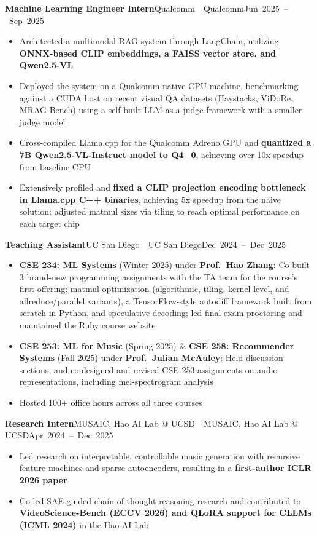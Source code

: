 \documentclass[letterpaper,11pt]{article}
\newcommand{\entry}[3]{%
  \needspace{4\baselineskip}%
  \textbf{#1}\ifx\relax#2\relax\else\ \textbar\ #2\fi\hfill\mbox{#3}\par}
\newenvironment{bullets}
  {\begin{itemize}[leftmargin=1.2em, label=\textbullet, itemsep=0.5pt, parsep=0pt, topsep=2pt]}
  {\end{itemize}\vspace{5pt}}
\begin{document}
\newpage
\entry{Machine Learning Engineer Intern}{Qualcomm}{Jun 2025 -- Sep 2025}
\begin{bullets}
  \item Architected a multimodal RAG system through LangChain, utilizing \textbf{ONNX-based CLIP embeddings, a FAISS vector store, and Qwen2.5-VL}
  \item Deployed the system on a Qualcomm-native CPU machine, benchmarking against a CUDA host on recent visual QA datasets (Haystacks, ViDoRe, MRAG-Bench) using a self-built LLM-as-a-judge framework with a smaller judge model
  \item Cross-compiled Llama.cpp for the Qualcomm Adreno GPU and \textbf{quantized a 7B Qwen2.5-VL-Instruct model to Q4\_0}, achieving over 10x speedup from baseline CPU
  \item Extensively profiled and \textbf{fixed a CLIP projection encoding bottleneck in Llama.cpp C++ binaries}, achieving 5x speedup from the naive solution; adjusted matmul sizes via tiling to reach optimal performance on each target chip
\end{bullets}

\entry{Teaching Assistant}{UC San Diego}{Dec 2024 -- Dec 2025}
\begin{bullets}
  \item \textbf{CSE 234: ML Systems} (Winter 2025) under \textbf{Prof.\ Hao Zhang}: Co-built 3 brand-new programming assignments with the TA team for the course's first offering: matmul optimization (algorithmic, tiling, kernel-level, and allreduce/parallel variants), a TensorFlow-style autodiff framework built from scratch in Python, and speculative decoding; led final-exam proctoring and maintained the Ruby course website
  \item \textbf{CSE 253: ML for Music} (Spring 2025) \& \textbf{CSE 258: Recommender Systems} (Fall 2025) under \textbf{Prof.\ Julian McAuley}: Held discussion sections, and co-designed and revised CSE 253 assignments on audio representations, including mel-spectrogram analysis
  \item Hosted 100+ office hours across all three courses
\end{bullets}

\entry{Research Intern}{MUSAIC, Hao AI Lab @ UCSD}{Apr 2024 -- Dec 2025}
\begin{bullets}
  \item Led research on interpretable, controllable music generation with recursive feature machines and sparse autoencoders, resulting in a \textbf{first-author ICLR 2026 paper}
  \item Co-led SAE-guided chain-of-thought reasoning research and contributed to \textbf{VideoScience-Bench (ECCV 2026) and QLoRA support for CLLMs (ICML 2024)} in the Hao AI Lab
\end{bullets}
\end{document}
